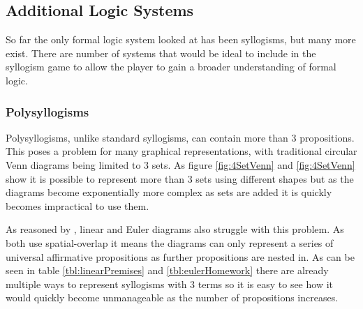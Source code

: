 \documentclass[12pt,a4paper]{report}
\begin{document}
\subsection{Additional Logic Systems}
So far the only formal logic system looked at has been syllogisms, but many more exist. There are number of systems that would be ideal to include in the syllogism game to allow the player to gain a broader understanding of formal logic.

\subsubsection{Polysyllogisms}
Polysyllogisms, unlike standard syllogisms, can contain more than 3 propositions. This poses a problem for many graphical representations, with traditional circular Venn diagrams being limited to 3 sets. As figure \ref{fig:4SetVenn} and \ref{fig:4SetVenn} show it is possible to represent more than 3 sets using different shapes but as the diagrams become exponentially more complex as sets are added it is quickly becomes impractical to use them.

As reasoned by \cite{cheng2014graphical}, linear and Euler diagrams also struggle with this problem. As both use spatial-overlap it means the diagrams can only represent a series of universal affirmative propositions as further propositions are nested in. As can be seen in table \ref{tbl:linearPremises} and \ref{tbl:eulerHomework} there are already multiple ways to represent syllogisms with 3 terms so it is easy to see how it would quickly become unmanageable as the number of propositions increases.
\end{document}
